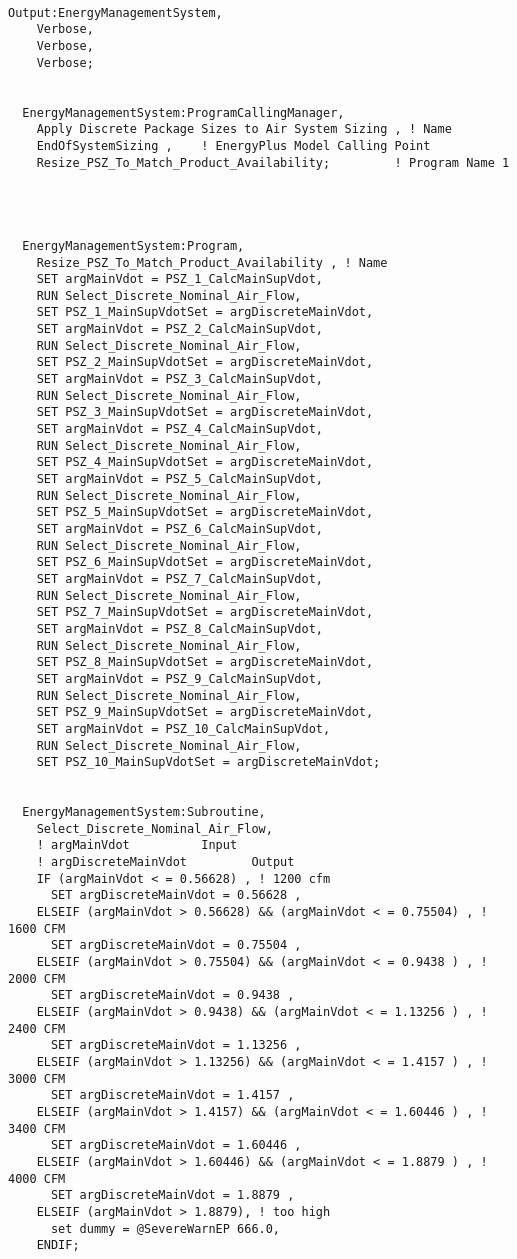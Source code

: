 \begin{lstlisting}

Output:EnergyManagementSystem,
    Verbose,
    Verbose,
    Verbose;


  EnergyManagementSystem:ProgramCallingManager,
    Apply Discrete Package Sizes to Air System Sizing , ! Name
    EndOfSystemSizing ,    ! EnergyPlus Model Calling Point
    Resize_PSZ_To_Match_Product_Availability;         ! Program Name 1




  EnergyManagementSystem:Program,
    Resize_PSZ_To_Match_Product_Availability , ! Name
    SET argMainVdot = PSZ_1_CalcMainSupVdot,
    RUN Select_Discrete_Nominal_Air_Flow,
    SET PSZ_1_MainSupVdotSet = argDiscreteMainVdot,
    SET argMainVdot = PSZ_2_CalcMainSupVdot,
    RUN Select_Discrete_Nominal_Air_Flow,
    SET PSZ_2_MainSupVdotSet = argDiscreteMainVdot,
    SET argMainVdot = PSZ_3_CalcMainSupVdot,
    RUN Select_Discrete_Nominal_Air_Flow,
    SET PSZ_3_MainSupVdotSet = argDiscreteMainVdot,
    SET argMainVdot = PSZ_4_CalcMainSupVdot,
    RUN Select_Discrete_Nominal_Air_Flow,
    SET PSZ_4_MainSupVdotSet = argDiscreteMainVdot,
    SET argMainVdot = PSZ_5_CalcMainSupVdot,
    RUN Select_Discrete_Nominal_Air_Flow,
    SET PSZ_5_MainSupVdotSet = argDiscreteMainVdot,
    SET argMainVdot = PSZ_6_CalcMainSupVdot,
    RUN Select_Discrete_Nominal_Air_Flow,
    SET PSZ_6_MainSupVdotSet = argDiscreteMainVdot,
    SET argMainVdot = PSZ_7_CalcMainSupVdot,
    RUN Select_Discrete_Nominal_Air_Flow,
    SET PSZ_7_MainSupVdotSet = argDiscreteMainVdot,
    SET argMainVdot = PSZ_8_CalcMainSupVdot,
    RUN Select_Discrete_Nominal_Air_Flow,
    SET PSZ_8_MainSupVdotSet = argDiscreteMainVdot,
    SET argMainVdot = PSZ_9_CalcMainSupVdot,
    RUN Select_Discrete_Nominal_Air_Flow,
    SET PSZ_9_MainSupVdotSet = argDiscreteMainVdot,
    SET argMainVdot = PSZ_10_CalcMainSupVdot,
    RUN Select_Discrete_Nominal_Air_Flow,
    SET PSZ_10_MainSupVdotSet = argDiscreteMainVdot;


  EnergyManagementSystem:Subroutine,
    Select_Discrete_Nominal_Air_Flow,
    ! argMainVdot          Input
    ! argDiscreteMainVdot         Output
    IF (argMainVdot < = 0.56628) , ! 1200 cfm
      SET argDiscreteMainVdot = 0.56628 ,
    ELSEIF (argMainVdot > 0.56628) && (argMainVdot < = 0.75504) , ! 1600 CFM
      SET argDiscreteMainVdot = 0.75504 ,
    ELSEIF (argMainVdot > 0.75504) && (argMainVdot < = 0.9438 ) , ! 2000 CFM
      SET argDiscreteMainVdot = 0.9438 ,
    ELSEIF (argMainVdot > 0.9438) && (argMainVdot < = 1.13256 ) , ! 2400 CFM
      SET argDiscreteMainVdot = 1.13256 ,
    ELSEIF (argMainVdot > 1.13256) && (argMainVdot < = 1.4157 ) , ! 3000 CFM
      SET argDiscreteMainVdot = 1.4157 ,
    ELSEIF (argMainVdot > 1.4157) && (argMainVdot < = 1.60446 ) , ! 3400 CFM
      SET argDiscreteMainVdot = 1.60446 ,
    ELSEIF (argMainVdot > 1.60446) && (argMainVdot < = 1.8879 ) , ! 4000 CFM
      SET argDiscreteMainVdot = 1.8879 ,
    ELSEIF (argMainVdot > 1.8879), ! too high
      set dummy = @SevereWarnEP 666.0,
    ENDIF;



\end{lstlisting}
